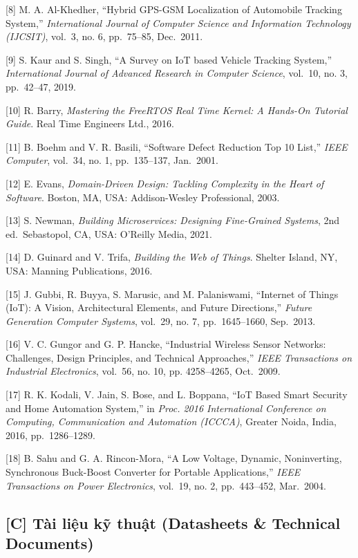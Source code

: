 \documentclass[a4paper]{extarticle}
\begin{document}
{[}8{]} M. A. Al-Khedher, ``Hybrid GPS-GSM Localization of Automobile
Tracking System,'' \emph{International Journal of Computer Science and
Information Technology (IJCSIT)}, vol.~3, no. 6, pp.~75--85, Dec.~2011.

{[}9{]} S. Kaur and S. Singh, ``A Survey on IoT based Vehicle Tracking
System,'' \emph{International Journal of Advanced Research in Computer
Science}, vol.~10, no. 3, pp.~42--47, 2019.

{[}10{]} R. Barry, \emph{Mastering the FreeRTOS Real Time Kernel: A Hands-On
Tutorial Guide}. Real Time Engineers Ltd., 2016.

{[}11{]} B. Boehm and V. R. Basili, ``Software Defect Reduction Top 10
List,'' \emph{IEEE Computer}, vol.~34, no. 1, pp.~135--137, Jan.~2001.

{[}12{]} E. Evans, \emph{Domain-Driven Design: Tackling Complexity in the Heart
of Software}. Boston, MA, USA: Addison-Wesley Professional, 2003.

{[}13{]} S. Newman, \emph{Building Microservices: Designing Fine-Grained
Systems}, 2nd ed.~Sebastopol, CA, USA: O'Reilly Media, 2021.

{[}14{]} D. Guinard and V. Trifa, \emph{Building the Web of Things}. Shelter
Island, NY, USA: Manning Publications, 2016.

{[}15{]} J. Gubbi, R. Buyya, S. Marusic, and M. Palaniswami, ``Internet of
Things (IoT): A Vision, Architectural Elements, and Future Directions,''
\emph{Future Generation Computer Systems}, vol.~29, no. 7, pp.~1645--1660,
Sep.~2013.

{[}16{]} V. C. Gungor and G. P. Hancke, ``Industrial Wireless Sensor
Networks: Challenges, Design Principles, and Technical Approaches,''
\emph{IEEE Transactions on Industrial Electronics}, vol.~56, no. 10, pp.
4258--4265, Oct.~2009.

{[}17{]} R. K. Kodali, V. Jain, S. Bose, and L. Boppana, ``IoT Based Smart
Security and Home Automation System,'' in \emph{Proc. 2016 International
Conference on Computing, Communication and Automation (ICCCA)}, Greater
Noida, India, 2016, pp.~1286--1289.

{[}18{]} B. Sahu and G. A. Rincon-Mora, ``A Low Voltage, Dynamic,
Noninverting, Synchronous Buck-Boost Converter for Portable
Applications,'' \emph{IEEE Transactions on Power Electronics}, vol.~19, no. 2,
pp.~443--452, Mar.~2004.


\subsection{{[}C{]} Tài liệu kỹ thuật (Datasheets \& Technical Documents)}\label{c-tuxe0i-liux1ec7u-kux1ef9-thuux1eadt-datasheets-technical-documents}
\end{document}
